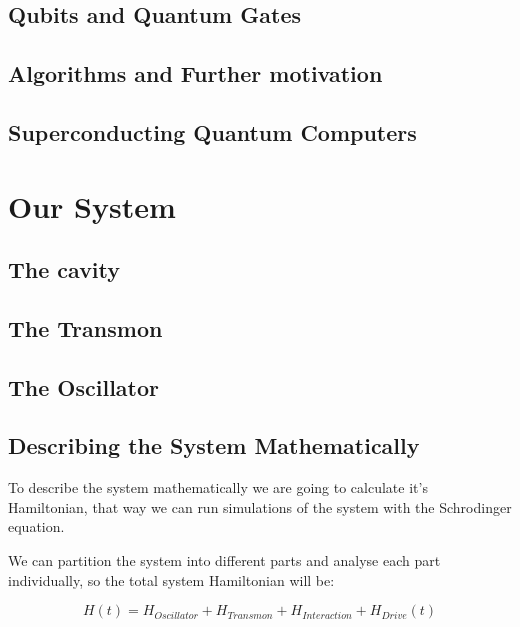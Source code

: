 \documentclass{article}
\numberwithin{equation}{section} %
\begin{document}
\subsection{Qubits and Quantum Gates}

\subsection{Algorithms and Further motivation}

\subsection{Superconducting Quantum Computers}

\newpage
\section{Our System}

\subsection{The cavity}

\subsection{The Transmon}

\subsection{The Oscillator}

\subsection{Describing the System Mathematically}  %
To describe the system mathematically we are going to calculate it's Hamiltonian, that way we can run simulations of the system with the Schrodinger equation.\par
We can partition the system into different parts and analyse each part individually, so the total system Hamiltonian will be:

\begin{equation}
H(t) = H_{Oscillator} + H_{Transmon}+ H_{Interaction} + H_{Drive}(t)
\end{equation}
\end{document}
